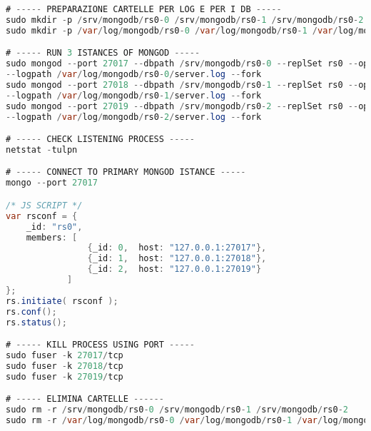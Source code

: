 \begin{lstlisting}[language=Java,  basicstyle=\footnotesize]
# ----- PREPARAZIONE CARTELLE PER LOG E PER I DB -----
sudo mkdir -p /srv/mongodb/rs0-0 /srv/mongodb/rs0-1 /srv/mongodb/rs0-2
sudo mkdir -p /var/log/mongodb/rs0-0 /var/log/mongodb/rs0-1 /var/log/mongodb/rs0-2

# ----- RUN 3 ISTANCES OF MONGOD -----
sudo mongod --port 27017 --dbpath /srv/mongodb/rs0-0 --replSet rs0 --oplogSize 128
--logpath /var/log/mongodb/rs0-0/server.log --fork
sudo mongod --port 27018 --dbpath /srv/mongodb/rs0-1 --replSet rs0 --oplogSize 128 
--logpath /var/log/mongodb/rs0-1/server.log --fork
sudo mongod --port 27019 --dbpath /srv/mongodb/rs0-2 --replSet rs0 --oplogSize 128 
--logpath /var/log/mongodb/rs0-2/server.log --fork

# ----- CHECK LISTENING PROCESS -----
netstat -tulpn

# ----- CONNECT TO PRIMARY MONGOD ISTANCE -----
mongo --port 27017

/* JS SCRIPT */
var rsconf = {
    _id: "rs0",
    members: [
                {_id: 0,  host: "127.0.0.1:27017"},
                {_id: 1,  host: "127.0.0.1:27018"},
                {_id: 2,  host: "127.0.0.1:27019"}
            ]
};
rs.initiate( rsconf );
rs.conf();
rs.status();

# ----- KILL PROCESS USING PORT -----
sudo fuser -k 27017/tcp
sudo fuser -k 27018/tcp
sudo fuser -k 27019/tcp

# ----- ELIMINA CARTELLE ------
sudo rm -r /srv/mongodb/rs0-0 /srv/mongodb/rs0-1 /srv/mongodb/rs0-2
sudo rm -r /var/log/mongodb/rs0-0 /var/log/mongodb/rs0-1 /var/log/mongodb/rs0-2

\end{lstlisting}